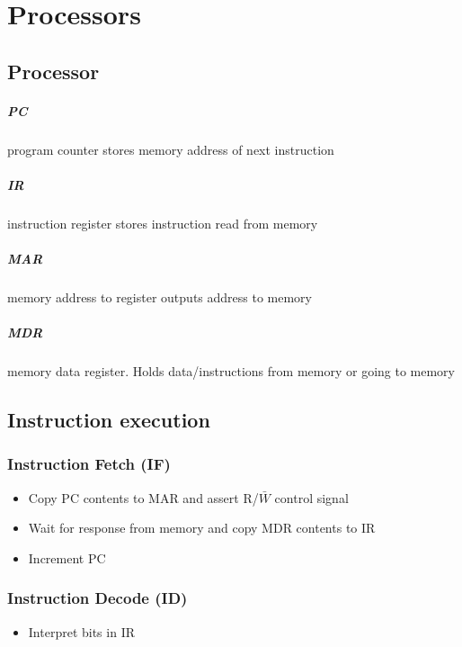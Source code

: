\chapter{Processors}
  \section{Processor}
    \paragraph{PC} program counter stores memory address of next instruction
    \paragraph{IR} instruction register stores instruction read from memory
    \paragraph{MAR} memory address to register outputs address to memory
    \paragraph{MDR} memory data register. Holds data/instructions from memory
    or going to memory

  \section{Instruction execution}
    \subsection{Instruction Fetch (IF)}
      \begin{itemize}
        \item Copy PC contents to MAR and assert R/$\bar{W}$ control signal
        \item Wait for response from memory and copy MDR contents to IR
        \item Increment PC
      \end{itemize}

    \subsection{Instruction Decode (ID)}
      \begin{itemize}
        \item Interpret bits in IR
      \end{itemize}

